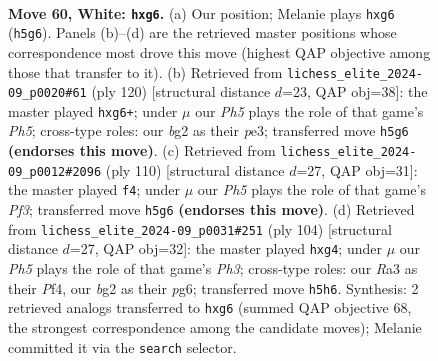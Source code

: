 \documentclass[11pt]{article}
\begin{document}
\clearpage

\begin{figure}[p]\centering
\begin{subfigure}{0.46\textwidth}\centering
\resizebox{\linewidth}{!}{%
\newchessgame
\chessboard[
  setfen={5k2/5p2/6p1/1R5P/1P6/R7/1r4b1/6K1 w - - 1 60},
  showmover=false,
  pgfstyle=straightmove, color=movearrow, markmove={h5-g6}
]}
\caption{}
\end{subfigure}\hfill
\begin{subfigure}{0.46\textwidth}\centering
\resizebox{\linewidth}{!}{%
\newchessgame
\chessboard[
  setfen={R7/P6k/6p1/7P/8/r3p3/4K3/8 w - - 0 61},
  showmover=false,
  pgfstyle=straightmove, color=movearrow, markmove={h5-g6}
]}
\caption{}
\end{subfigure}
\\[4pt]
\begin{subfigure}{0.46\textwidth}\centering
\resizebox{\linewidth}{!}{%
\newchessgame
\chessboard[
  setfen={8/8/4kp2/1R4p1/1P6/4KP2/1r6/8 w - - 8 56},
  showmover=false,
  pgfstyle=straightmove, color=movearrow, markmove={f3-f4}
]}
\caption{}
\end{subfigure}\hfill
\begin{subfigure}{0.46\textwidth}\centering
\resizebox{\linewidth}{!}{%
\newchessgame
\chessboard[
  setfen={2R5/2P3k1/2r3pp/8/3K1Pp1/7P/8/8 w - - 0 53},
  showmover=false,
  pgfstyle=straightmove, color=movearrow, markmove={h3-g4}
]}
\caption{}
\end{subfigure}
\caption{\textbf{Move 60, White: \texttt{hxg6}.} (a) Our position; Melanie plays \texttt{hxg6} (\texttt{h5g6}). Panels (b)--(d) are the retrieved master positions whose correspondence most drove this move (highest QAP objective among those that transfer to it). (b) Retrieved from \texttt{lichess\_elite\_2024-09\_p0020\#61} (ply 120) [structural distance $d$=23, QAP obj=38]: the master played \texttt{hxg6+}; under $\mu$ our \emph{Ph5} plays the role of that game's \emph{Ph5}; cross-type roles: our \emph{b}g2 as their \emph{p}e3; transferred move \texttt{h5g6} \textbf{(endorses this move)}. (c) Retrieved from \texttt{lichess\_elite\_2024-09\_p0012\#2096} (ply 110) [structural distance $d$=27, QAP obj=31]: the master played \texttt{f4}; under $\mu$ our \emph{Ph5} plays the role of that game's \emph{Pf3}; transferred move \texttt{h5g6} \textbf{(endorses this move)}. (d) Retrieved from \texttt{lichess\_elite\_2024-09\_p0031\#251} (ply 104) [structural distance $d$=27, QAP obj=32]: the master played \texttt{hxg4}; under $\mu$ our \emph{Ph5} plays the role of that game's \emph{Ph3}; cross-type roles: our \emph{R}a3 as their \emph{P}f4, our \emph{b}g2 as their \emph{p}g6; transferred move \texttt{h5h6}. Synthesis: 2 retrieved analogs transferred to \texttt{hxg6} (summed QAP objective 68, the strongest correspondence among the candidate moves); Melanie committed it via the \texttt{search} selector.}
\label{fig:thought-m118}
\end{figure}
\end{document}
